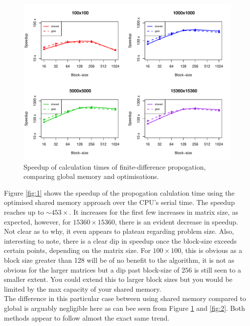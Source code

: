 \documentclass[12pt]{article}
\begin{document}
\begin{figure}
	\centering
	\includegraphics[width=\linewidth]{../plots/fdcalc_sharedvglob.pdf}
	\caption{Speedup of calculation times of finite-difference propogation, comparing global memory and optimisations.}
	\label{fig:3}
\end{figure}
Figure \ref{fig:1} shows the speedup of the propogation calulation time using the optimised shared memory approach over the CPU's serial time. The speedup reaches up to $\sim453\times$. It increases for the first few increases in matrix size, as expected, however, for $15360\times15360$, there is an evident decrease in speedup. Not clear as to why, it even appears to plateau regarding problem size. Also, interesting to note, there is a clear dip in speedup once the block-size exceeds certain points, depending on the matrix size. For $100\times100$, this is obvious as a block size greater than 128 will be of no benefit to the algorithm, it is not as obvious for the larger matrices but a dip past block-size of $256$ is still seen to a smaller extent. You could extend this to larger block sizes but you would be limited by the max capacity of your shared memory.\\
The difference in this particular case between using shared memory compared to global is arguably negligible here as can bee seen from Figure \ref{fig:3} and \ref{fig:2}. Both methods appear to follow almost the exact same trend.
\end{document}
